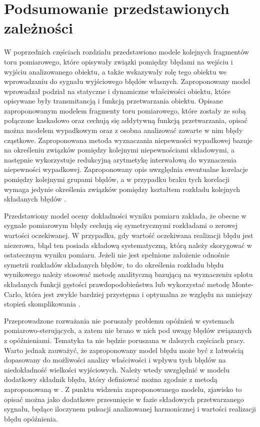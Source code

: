 \section{Podsumowanie przedstawionych zależności}

W poprzednich częściach rozdziału przedstawiono modele kolejnych fragmentów toru pomiarowego, które opisywały związki pomiędzy błędami na wejściu i wyjściu analizowanego obiektu, a także wskazywały rolę tego obiektu we wprowadzaniu do sygnału wyjściowego błędów własnych. Zaproponowany model wprowadzał podział na statyczne i dynamiczne właściwości obiektu, które opisywane były transmitancją i funkcją przetwarzania obiektu. Opisane zaproponowanym modelem fragmenty toru pomiarowego, które zostały ze sobą połączone kaskadowo oraz cechują się addytywną funkcją przetwarzania, opisać można modelem wypadkowym oraz z osobna analizować zawarte w nim błędy cząstkowe. Zaproponowana metoda wyznaczania niepewności wypadkowej bazuje na określeniu związków pomiędzy kolejnymi niepewnościami składowymi, a następnie wykorzystuje redukcyjną arytmetykę interwałową do wyznaczenia niepewności wypadkowej. Zaproponowany opis uwzględnia ewentualne korelacje pomiędzy kolejnymi grupami błędów, a w przypadku braku tych korelacji wymaga jedynie określenia związków pomiędzy kształtem rozkładu kolejnych składanych błędów \cite{jakubiec_reductive, batko_uncertainty}.

Przedstawiony model oceny dokładności wyniku pomiaru zakłada, że obecne w sygnale pomiarowym błędy cechują się symetrycznymi rozkładami o zerowej wartości oczekiwanej. W przypadku, gdy wartość oczekiwana realizacji błędu jest niezerowa, błąd ten posiada składową systematyczną, którą należy skorygować w ostatecznym wyniku pomiaru. Jeżeli nie jest spełnione założenie odnośnie symetrii rozkładów składanych błędów, to do określenia rozkładu błędu wynikowego należy stosować metodę analityczną bazującą na wyznaczeniu splotu składanych funkcji gęstości prawdopodobieństwa lub wykorzystać metodę Monte-Carlo, która jest zwykle bardziej przystępna i optymalna ze względu na mniejszy stopień skomplikowania \cite{janssen_montecarlo, roj_annuncertainty}.

Przeprowadzone rozważania nie poruszały problemu opóźnień w systemach pomiarowo-sterujących, a zatem nie brano w nich pod uwagę błędów związanych z opóźnieniami. Tematyka ta nie będzie poruszana w dalszych częściach pracy. Warto jednak zauważyć, że zaproponowany model błędu może być z łatwością dopasowany do możliwości analizy właściwości i wpływu tych błędów na niedokładność wielkości wyjściowych. Należy wtedy uwzględnić w modelu dodatkowy składnik błędu, który definiować można zgodnie z metodą zaproponowaną w \cite{wymyslo_delay, jakubiec_system}. Z punktu widzenia zaproponowanego modelu, zjawisko to opisać można jako dodatkowe przesunięcie w fazie składowych przetwarzanego sygnału, będące iloczynem pulsacji analizowanej harmonicznej i wartości realizacji błędu opóźnienia.

